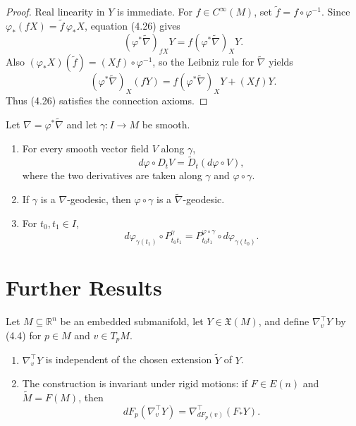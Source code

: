 \begin{proof}
\sketch Real linearity in $Y$ is immediate. For $f\in C^\infty(M)$, set
$\widetilde f=f\circ\varphi^{-1}$. Since
$\varphi_*(fX)=\widetilde f\,\varphi_*X$, equation (4.26) gives
\[
(\varphi^*\widetilde\nabla)_{fX}Y
=f(\varphi^*\widetilde\nabla)_XY.
\]
Also $(\varphi_*X)(\widetilde f)=(Xf)\circ\varphi^{-1}$, so the Leibniz rule for
$\widetilde\nabla$ yields
\[
(\varphi^*\widetilde\nabla)_X(fY)
=f(\varphi^*\widetilde\nabla)_XY+(Xf)Y.
\]
Thus (4.26) satisfies the connection axioms.
\end{proof}

\begin{proposition}
\label{prop:pullback-connection-properties}



Let $\nabla=\varphi^*\widetilde\nabla$ and let $\gamma\colon I\to M$ be smooth.
\begin{enumerate}
\item[(a)] For every smooth vector field $V$ along $\gamma$,
\[
d\varphi\circ D_tV=\widetilde D_t(d\varphi\circ V),
\]
where the two derivatives are taken along $\gamma$ and $\varphi\circ\gamma$.
\item[(b)] If $\gamma$ is a $\nabla$-geodesic, then $\varphi\circ\gamma$ is a
$\widetilde\nabla$-geodesic.
\item[(c)] For $t_0,t_1\in I$,
\[
d\varphi_{\gamma(t_1)}\circ P_{t_0t_1}^\gamma
=P_{t_0t_1}^{\varphi\circ\gamma}\circ d\varphi_{\gamma(t_0)}.
\]
\end{enumerate}
\end{proposition}
\section{Further Results}

\begin{proposition}
\label{prop:embedded-submanifold-covariant-derivative}
Let $M\subseteq\mathbb R^n$ be an embedded submanifold, let
$Y\in\mathfrak X(M)$, and define $\nabla_v^\top Y$ by (4.4) for
$p\in M$ and $v\in T_pM$.
\begin{enumerate}
\item[(a)] $\nabla_v^\top Y$ is independent of the chosen extension
$\widetilde Y$ of $Y$.
\item[(b)] The construction is invariant under rigid motions: if $F\in E(n)$ and
$\widetilde M=F(M)$, then
\[
dF_p(\nabla_v^\top Y)=\nabla_{dF_p(v)}^\top(F_*Y).
\]
\end{enumerate}
\end{proposition}


